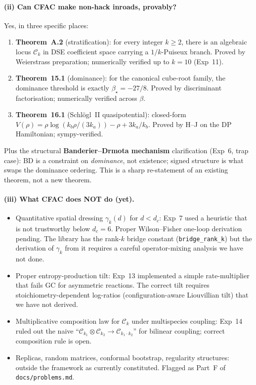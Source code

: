 \documentclass[11pt,a4paper]{article}
\theoremstyle{plain}
\begin{document}
\paragraph{(ii) Can CFAC make non-hack inroads, provably?}
Yes, in three specific places:
\begin{enumerate}[leftmargin=1.2em]
\item \textbf{Theorem~A.2} (stratification): for every integer $k\geq 2$,
  there is an algebraic locus $\mathcal{C}_{k}$ in DSE coefficient space
  carrying a $1/k$-Puiseux branch.  Proved by Weierstrass preparation;
  numerically verified up to $k = 10$ (Exp~11).
\item \textbf{Theorem~15.1} (dominance): for the canonical cube-root
  family, the dominance threshold is exactly $\beta_{\star} = -27/8$.
  Proved by discriminant factorisation; numerically verified across $\beta$.
\item \textbf{Theorem~16.1} (Schl\"ogl~II quasipotential): closed-form
  $V(\rho) = \rho\log(k_{b}\rho/(3k_{a})) - \rho + 3 k_{a}/k_{b}$.
  Proved by H--J on the DP Hamiltonian; sympy-verified.
\end{enumerate}
Plus the structural \textbf{Banderier--Drmota mechanism} clarification
(Exp~6, trap case): BD is a constraint on \emph{dominance}, not
existence; signed structure is what swaps the dominance ordering.  This
is a sharp re-statement of an existing theorem, not a new theorem.

\paragraph{(iii) What CFAC does NOT do (yet).}
\begin{itemize}[leftmargin=1.2em]
\item Quantitative spatial dressing $\gamma_{k}(d)$ for $d < d_{c}$:
  Exp~7 used a heuristic that is not trustworthy below $d_{c} = 6$.
  Proper Wilson--Fisher one-loop derivation pending.  The library has
  the rank-$k$ bridge constant (\texttt{bridge\_rank\_k}) but the
  derivation of $\gamma_{k}$ from it requires a careful operator-mixing
  analysis we have not done.
\item Proper entropy-production tilt: Exp~13 implemented a simple
  rate-multiplier that fails GC for asymmetric reactions.  The correct
  tilt requires stoichiometry-dependent log-ratios (configuration-aware
  Liouvillian tilt) that we have not derived.
\item Multiplicative composition law for $\mathcal{C}_{k}$ under
  multispecies coupling: Exp~14 ruled out the naive
  ``$\mathcal{C}_{k_{1}} \otimes \mathcal{C}_{k_{2}} \to
  \mathcal{C}_{k_{1}\cdot k_{2}}$'' for bilinear coupling; correct
  composition rule is open.
\item Replicas, random matrices, conformal bootstrap, regularity
  structures: outside the framework as currently constituted.  Flagged
  as Part~F of \texttt{docs/problems.md}.
\end{itemize}
\end{document}
